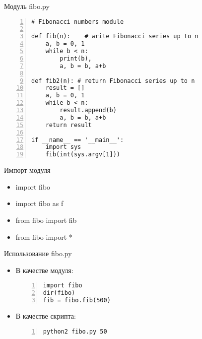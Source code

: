 \documentclass[hyperref={pdftex,unicode}]{beamer}
\begin{document}




\begin{frame}[fragile]{Модуль fibo.py}
  \begin{lstlisting}[basicstyle=\footnotesize\ttfamily,numbers=left]
# Fibonacci numbers module

def fib(n):    # write Fibonacci series up to n
    a, b = 0, 1
    while b < n:
        print(b),
        a, b = b, a+b

def fib2(n): # return Fibonacci series up to n
    result = []
    a, b = 0, 1
    while b < n:
        result.append(b)
        a, b = b, a+b
    return result

if __name__ == '__main__':
    import sys
    fib(int(sys.argv[1]))
\end{lstlisting}
\end{frame}

\begin{frame}{Импорт модуля}
  \begin{itemize}
    \item import fibo
    \item import fibo as f
    \item from fibo import fib
    \item from fibo import *
  \end{itemize}
\end{frame}

\begin{frame}[fragile]{Использование fibo.py}
\begin{itemize}
\item В качестве модуля:
  \begin{lstlisting}[numbers=left]
import fibo
dir(fibo)
fib = fibo.fib(500)
  \end{lstlisting}
\item В качестве скрипта:
  \begin{lstlisting}[language=bash,numbers=left]
python2 fibo.py 50
  \end{lstlisting}
\end{itemize}
\end{frame}
\end{document}
